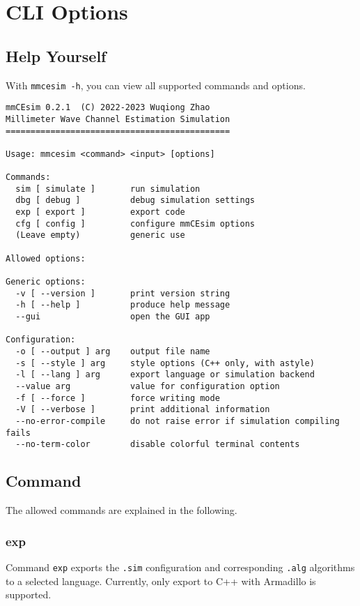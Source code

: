 \section{CLI Options}

\subsection{Help Yourself}\label{d:subsec:cli_opt_help_yourself}

With \texttt{mmcesim -h}, you can view all supported commands and options.
\begin{lstlisting}
mmCEsim 0.2.1  (C) 2022-2023 Wuqiong Zhao
Millimeter Wave Channel Estimation Simulation
=============================================

Usage: mmcesim <command> <input> [options]

Commands:
  sim [ simulate ]       run simulation
  dbg [ debug ]          debug simulation settings
  exp [ export ]         export code
  cfg [ config ]         configure mmCEsim options
  (Leave empty)          generic use

Allowed options:

Generic options:
  -v [ --version ]       print version string
  -h [ --help ]          produce help message
  --gui                  open the GUI app

Configuration:
  -o [ --output ] arg    output file name
  -s [ --style ] arg     style options (C++ only, with astyle)
  -l [ --lang ] arg      export language or simulation backend
  --value arg            value for configuration option
  -f [ --force ]         force writing mode
  -V [ --verbose ]       print additional information
  --no-error-compile     do not raise error if simulation compiling fails
  --no-term-color        disable colorful terminal contents
\end{lstlisting}

\subsection{Command}

The allowed commands are explained in the following.

\subsubsection{exp}
Command \texttt{exp} exports the \texttt{.sim} configuration and corresponding \texttt{.alg} algorithms
to a selected language.
Currently, only export to C++ with Armadillo is supported.

